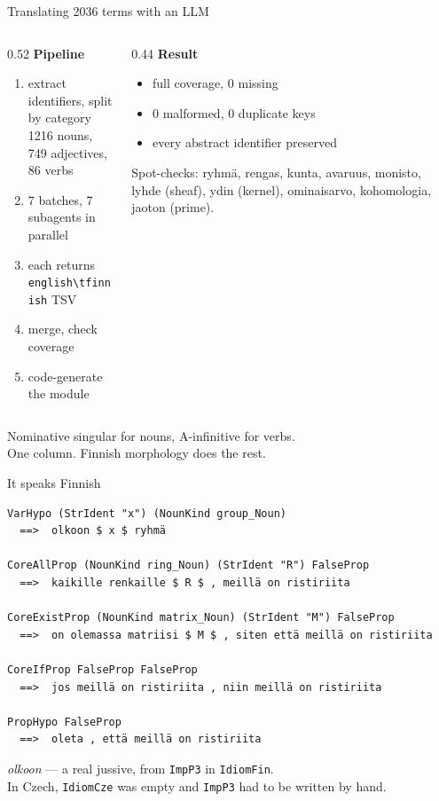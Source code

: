 \documentclass[10pt,aspectratio=169]{beamer}
\newcommand{\ok}[1]{\textcolor{good}{#1}}
\begin{document}
\begin{frame}{Translating 2036 terms with an LLM}
  \begin{columns}[T]
  \begin{column}{0.52\textwidth}
  \textbf{Pipeline}
  \begin{enumerate}\small
    \item extract identifiers, split by category \\
          \small 1216 nouns, 749 adjectives, 86 verbs
    \item 7 batches, 7 subagents in parallel
    \item each returns \texttt{english\textbackslash tfinnish} TSV
    \item merge, check coverage
    \item code-generate the module
  \end{enumerate}
  \end{column}
  \begin{column}{0.44\textwidth}
  \textbf{Result}
  \begin{itemize}\small
    \item full coverage, 0 missing
    \item 0 malformed, 0 duplicate keys
    \item every abstract identifier preserved
  \end{itemize}
  \vspace{0.5em}
  \small Spot-checks: ryhmä, rengas, kunta, avaruus, monisto, lyhde (sheaf),
  ydin (kernel), ominaisarvo, kohomologia, jaoton (prime).
  \end{column}
  \end{columns}

  \vspace{1em}
  \begin{center}
  Nominative singular for nouns, A-infinitive for verbs. \\
  One column. Finnish morphology does the rest.
  \end{center}
\end{frame}

\begin{frame}[fragile]{It speaks Finnish}
\begin{lstlisting}
VarHypo (StrIdent "x") (NounKind group_Noun)
  ==>  olkoon $ x $ ryhmä

CoreAllProp (NounKind ring_Noun) (StrIdent "R") FalseProp
  ==>  kaikille renkaille $ R $ , meillä on ristiriita

CoreExistProp (NounKind matrix_Noun) (StrIdent "M") FalseProp
  ==>  on olemassa matriisi $ M $ , siten että meillä on ristiriita

CoreIfProp FalseProp FalseProp
  ==>  jos meillä on ristiriita , niin meillä on ristiriita

PropHypo FalseProp
  ==>  oleta , että meillä on ristiriita
\end{lstlisting}

  \vspace{0.3em}
  \ok{\emph{olkoon}} --- a real jussive, from \texttt{ImpP3} in \texttt{IdiomFin}. \\
  \small In Czech, \texttt{IdiomCze} was empty and \texttt{ImpP3} had to be written by hand.
\end{frame}
\end{document}
